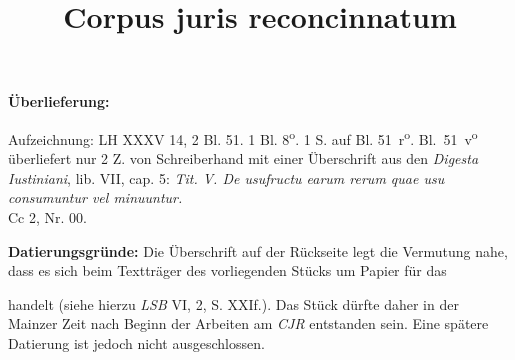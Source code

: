   \begin{ledgroupsized}[r]{120mm}
                \footnotesize 
                \pstart                
                \noindent\textbf{\"{U}berlieferung:}   
                \pend
                \end{ledgroupsized}
            
              
                           \begin{ledgroupsized}[r]{114mm}
 \footnotesize 
 \pstart \parindent -6mm
%
Aufzeichnung: LH XXXV 14, 2 Bl. 51. 1 Bl. 8\textsuperscript{o}. 1 S. auf Bl. 51~r\textsuperscript{o}.
Bl.~51~v\textsuperscript{o} überliefert nur 2 Z. von Schreiberhand mit einer \"{U}berschrift aus den \textit{Digesta Iustiniani}, lib. VII, cap. 5:
\textit{Tit. V. De usufructu earum rerum quae usu consumuntur vel minuuntur.}\\%
Cc 2, Nr. 00.
\pend
 \end{ledgroupsized}
 \vspace*{5mm}
 \begin{ledgroup}
 \footnotesize 
 \pstart
\noindent%
\footnotesize{\textbf{Datierungsgr\"{u}nde:}
Die \"{U}berschrift auf der R\"{u}ckseite legt die Vermutung nahe, dass es sich beim Textträger des vorliegenden Stücks um Papier für das \title{Corpus juris reconcinnatum} handelt (siehe hierzu \textit{LSB} VI, 2, S. XXIf.). Das St\"{u}ck d\"{u}rfte daher in der Mainzer Zeit nach Beginn der Arbeiten am \textit{CJR} entstanden sein. Eine spätere Datierung ist jedoch nicht ausgeschlossen.}
\pend
 \end{ledgroup}

